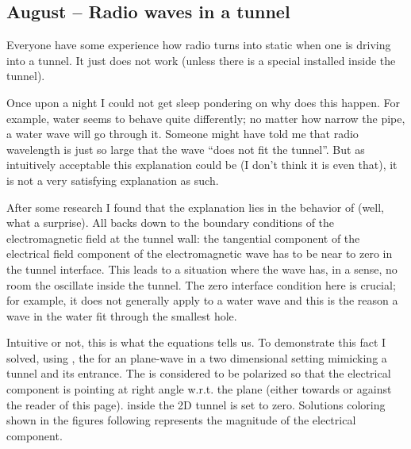 \documentclass{article}
\begin{document}
\subsection{August – Radio waves in a tunnel}

Everyone have some experience how radio turns into static when one is driving into a tunnel. It just does not work (unless there is a special  installed inside the tunnel).

 Once upon a night I could not get sleep pondering on why does this happen. For example, water seems to behave quite differently; no matter how narrow the pipe, a water wave will go through it. Someone might have told me that  radio wavelength is just so large that the wave ``does not fit the tunnel''. But as intuitively acceptable this explanation could be (I don't think it is even that), it is not a very satisfying explanation as such.

After some research I found that the explanation lies in the behavior of  (well, what a surprise). All backs down to the boundary conditions of the electromagnetic field at the tunnel wall: the tangential component of the electrical field component of the electromagnetic wave has to be near to zero in the tunnel interface. This leads to a situation where the wave has, in a sense, no room the oscillate inside the tunnel. The zero interface condition here is crucial; for example, it does not generally apply to a water wave and this is the reason a wave in the water fit through the smallest hole.

Intuitive or not, this is what the equations tells us. To demonstrate this fact I solved, using , the  for an plane-wave in a two dimensional setting mimicking a tunnel and its entrance. The   is considered to be polarized so that the electrical component is pointing at right angle w.r.t. the plane (either towards or against the reader of this page).   inside the 2D tunnel is set to zero. Solutions coloring shown in the figures following represents the magnitude of the electrical component.
\end{document}
